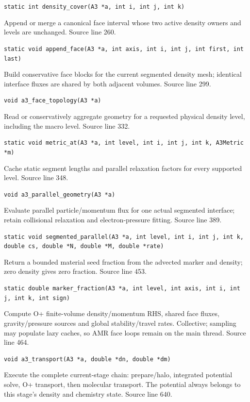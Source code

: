 \begin{description}[style=nextline,leftmargin=0pt,labelindent=0pt,labelwidth=0pt,labelsep=0pt]
{\small\nolinkurl{static int density_cover(A3 *a, int i, int j, int k)}}
\item[\texttt{append\_face}] Append or merge a canonical face interval whose two active density owners and levels are unchanged. Source line 260.\par
{\small\nolinkurl{static void append_face(A3 *a, int axis, int i, int j, int first, int last)}}
\item[\texttt{a3\_face\_topology}] Build conservative face blocks for the current segmented density mesh; identical interface fluxes are shared by both adjacent volumes. Source line 299.\par
{\small\nolinkurl{void a3_face_topology(A3 *a)}}
\item[\texttt{metric\_at}] Read or conservatively aggregate geometry for a requested physical density level, including the macro level. Source line 332.\par
{\small\nolinkurl{static void metric_at(A3 *a, int level, int i, int j, int k, A3Metric *m)}}
\item[\texttt{a3\_parallel\_geometry}] Cache static segment lengths and parallel relaxation factors for every supported level. Source line 348.\par
{\small\nolinkurl{void a3_parallel_geometry(A3 *a)}}
\item[\texttt{segmented\_parallel}] Evaluate parallel particle/momentum flux for one actual segmented interface; retain collisional relaxation and electron-pressure fitting. Source line 389.\par
{\small\nolinkurl{static void segmented_parallel(A3 *a, int level, int i, int j, int k, double cs, double *N, double *M, double *rate)}}
\item[\texttt{marker\_fraction}] Return a bounded material seed fraction from the advected marker and density; zero density gives zero fraction. Source line 453.\par
{\small\nolinkurl{static double marker_fraction(A3 *a, int level, int axis, int i, int j, int k, int sign)}}
\item[\texttt{a3\_transport}] Compute O+ finite-volume density/momentum RHS, shared face fluxes, gravity/pressure sources and global stability/travel rates. Collective; sampling may populate lazy caches, so AMR face loops remain on the main thread. Source line 464.\par
{\small\nolinkurl{void a3_transport(A3 *a, double *dn, double *dm)}}
\item[\texttt{rhs}] Execute the complete current-stage chain: prepare/halo, integrated potential solve, O+ transport, then molecular transport. The potential always belongs to this stage's density and chemistry state. Source line 640.\par

\end{description}
